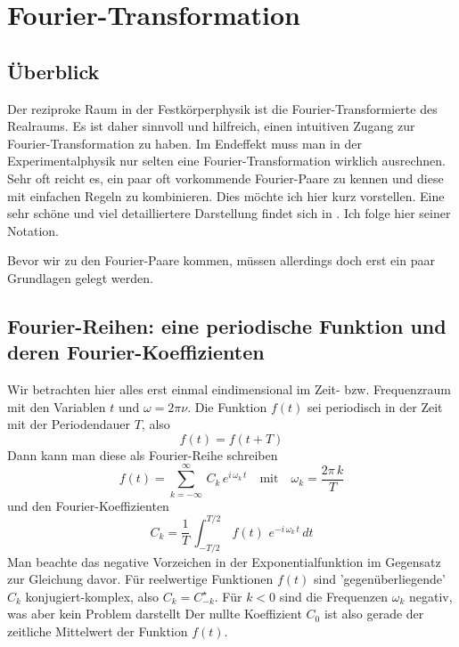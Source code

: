 
\chapter{Fourier-Transformation}



\section{Überblick}

Der reziproke Raum in der Festkörperphysik ist die Fourier-Transformierte des Realraums. Es ist daher sinnvoll und hilfreich, einen intuitiven Zugang zur Fourier-Transformation zu haben. Im Endeffekt muss man in der Experimentalphysik nur selten eine Fourier-Transformation wirklich ausrechnen. Sehr oft reicht es, ein paar oft vorkommende Fourier-Paare zu kennen und diese mit einfachen Regeln zu kombinieren. Dies möchte ich hier kurz vorstellen. Eine sehr schöne und viel detailliertere Darstellung findet sich in \cite{Butz2011}. Ich folge hier seiner Notation.

Bevor wir zu den Fourier-Paare kommen, müssen allerdings doch erst ein paar Grundlagen gelegt werden.

\section{Fourier-Reihen: eine periodische Funktion und deren Fourier-Koeffizienten}

Wir betrachten hier alles erst einmal eindimensional im Zeit- bzw. Frequenzraum mit den Variablen $t$ und $\omega = 2 \pi \nu$. Die Funktion $f(t)$ sei periodisch in der Zeit mit der Periodendauer $T$, also 
\begin{equation}
 f(t) = f (t + T)
\end{equation}
Dann kann man diese als Fourier-Reihe schreiben
\begin{equation}
 f(t) = \sum_{k=-\infty}^{\infty} \, C_k \, e^{i \, \omega_k \, t}
 \quad \text{mit} \quad \omega_k = \frac{2 \pi \, k}{T}
\end{equation}
und den Fourier-Koeffizienten
\begin{equation}
 C_k = \frac{1}{T} \, \int_{-T/2}^{T/2} \, f(t) \, \, e^{-i \, \omega_k \, t} \, dt
\end{equation}
Man beachte das negative Vorzeichen in der Exponentialfunktion im Gegensatz zur Gleichung davor. Für reelwertige Funktionen $f(t)$ sind 'gegenüberliegende' $C_k$ konjugiert-komplex, also  $C_k = C_{-k}^\star$. Für $k<0$ sind die Frequenzen $\omega_k$ negativ, was aber kein Problem darstellt Der nullte Koeffizient $C_0$ ist also gerade der zeitliche Mittelwert der Funktion $f(t)$.



